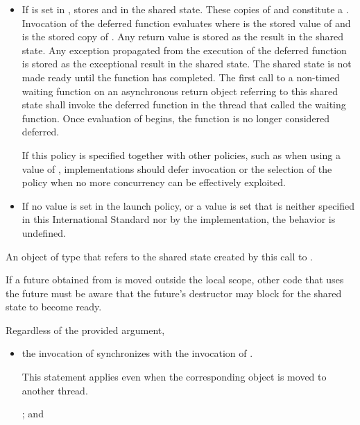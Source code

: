 \begin{itemdescr}
\begin{itemize}
\item
If  is set in ,
stores  and
in the shared state. These copies of  and  constitute
a . Invocation of the deferred function evaluates
 where  is the stored value of
 and  is the stored copy of
.
Any return value is stored
as the result in the shared state.
Any exception propagated
from the execution
of the deferred function
is stored as the exceptional result
in the shared state.
The shared state is not
made ready until the function has completed. The first call to a
non-timed waiting function
on an asynchronous return object referring to
this shared state shall invoke the
deferred function in the thread that called the waiting function.
Once evaluation of  begins, the function is no longer
considered deferred.
\begin{note} If this policy is specified together with other policies, such as when using a
 value of , implementations should defer
invocation or the selection of the policy when no more concurrency can be effectively
exploited. \end{note}

\item
If no value is set in the launch policy, or a value is set that is neither specified
in this International Standard nor by the implementation, the behavior is undefined.
\end{itemize}

\pnum
\returns An object of type
 that refers
to the shared state created by this call to .
\begin{note} If a future obtained from  is moved outside the local scope,
other code that uses the future must be aware that the future's destructor may
block for the shared state to become ready. \end{note}

\pnum
\sync
Regardless of the provided  argument,
\begin{itemize}
\item
the invocation of 
synchronizes with the invocation of . \begin{note}
This statement applies even when the corresponding  object is moved to
another thread. \end{note}; and


\end{itemize}
\end{itemdescr}
